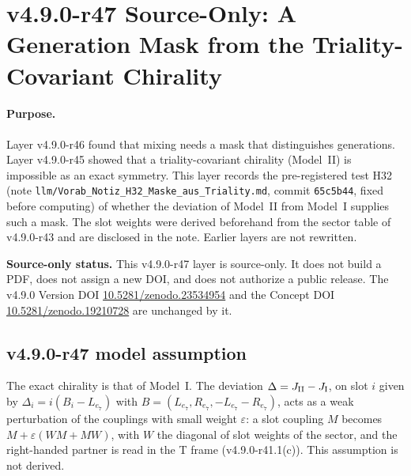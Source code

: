 \clearpage
\section*{v4.9.0-r47 Source-Only: A Generation Mask from the Triality-Covariant Chirality}
\label{sec:v490-r47-mask-from-triality}

\paragraph{Purpose.}
Layer v4.9.0-r46 found that mixing needs a mask that distinguishes generations.  Layer v4.9.0-r45 showed that a triality-covariant chirality
(Model~II) is impossible as an exact symmetry.  This layer records the pre-registered test H32 (note
\texttt{llm/Vorab\_Notiz\_H32\_Maske\_aus\_Triality.md}, commit \texttt{65c5b44}, fixed before computing) of whether the deviation of
Model~II from Model~I supplies such a mask.  The slot weights were derived beforehand from the sector table of v4.9.0-r43 and are disclosed
in the note.  Earlier layers are not rewritten.

\noindent\textbf{Source-only status.}
This v4.9.0-r47 layer is source-only.  It does not build a PDF, does not assign a new DOI,
and does not authorize a public release.  The v4.9.0 Version DOI
\href{https://doi.org/10.5281/zenodo.23534954}{10.5281/zenodo.23534954} and the Concept DOI
\href{https://doi.org/10.5281/zenodo.19210728}{10.5281/zenodo.19210728} are unchanged by it.

\subsection*{v4.9.0-r47 model assumption}
\label{subsec:v490-r47-assumption}

The exact chirality is that of Model~I.  The deviation \(\Delta=J_{\rm II}-J_{\rm I}\), on slot \(i\) given by \(\Delta_i=i(B_i-L_{e_7})\) with
\(B=(L_{e_7},R_{e_7},-L_{e_7}-R_{e_7})\), acts as a weak perturbation of the couplings with small weight \(\varepsilon\): a slot coupling \(M\) becomes
\(M+\varepsilon(WM+MW)\), with \(W\) the diagonal of slot weights of the sector, and the right-handed partner is read in the T frame
(v4.9.0-r41.1(c)).  This assumption is not derived.

